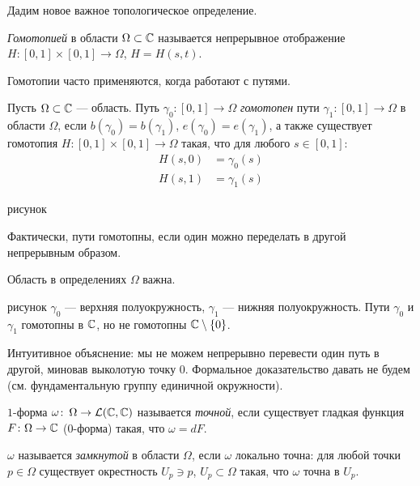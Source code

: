 Дадим новое важное топологическое определение.
\begin{df}[гомотопия]
 \textit{Гомотопией} в области $\Omega \subset \mathbb{C}$ называется непрерывное отображение $H \colon [0,1] \times [0,1] \to \Omega$, $H = H(s,t)$. 
\end{df}

Гомотопии часто применяются, когда работают с путями.

\begin{df}
 Пусть $\Omega \subset \mathbb{C}$ --- область. Путь $\gamma_0 \colon [0,1] \to \Omega$ \textit{гомотопен} пути $\gamma_1 \colon [0,1] \to \Omega$ в области $\Omega$, если $b(\gamma_0) = b(\gamma_1)$, $e(\gamma_0) = e(\gamma_1)$, а также существует гомотопия $H \colon [0,1] \times [0,1] \to \Omega$  такая, что для любого $s \in [0,1]$:
 \begin{align*}
  H(s, 0) &= \gamma_0(s) \\
  H(s,1) &= \gamma_1(s)
 \end{align*} 
\end{df}
\begin{exmpl}
{\color{red} рисунок}
\end{exmpl}

Фактически, пути гомотопны, если один можно переделать в другой непрерывным образом.

Область в определениях $\Omega$ важна.

\begin{exmpl}
 {\color{red} рисунок} $\gamma_0$ --- верхняя полуокружность, $\gamma_1$ ---  нижняя полуокружность. Пути $\gamma_0$ и $\gamma_1$ гомотопны в $\mathbb{C}$, но не гомотопны $\mathbb{C} \setminus \left\{ 0 \right\}$.

 Интуитивное объяснение: мы не можем непрерывно перевести один путь в другой, миновав выколотую точку $0$. Формальное доказательство давать не будем (см. фундаментальную группу единичной окружности).
\end{exmpl}

\begin{df}
 $1$-форма $\omega \colon\, \Omega \to \mathcal{L}(\mathbb{C},\mathbb{C})$ называется \textit{точной}, если существует гладкая функция $F \colon \Omega \to \mathbb{C} $ ($0$-форма) такая, что $\omega = dF$.

 $\omega$ называется \textit{замкнутой} в области $\Omega$, если $\omega$ локально точна: для любой точки $p \in \Omega$ существует окрестность $U_p \ni p$, $U_p \subset \Omega$ такая, что $\omega$ точна в $U_p$.
\end{df}


